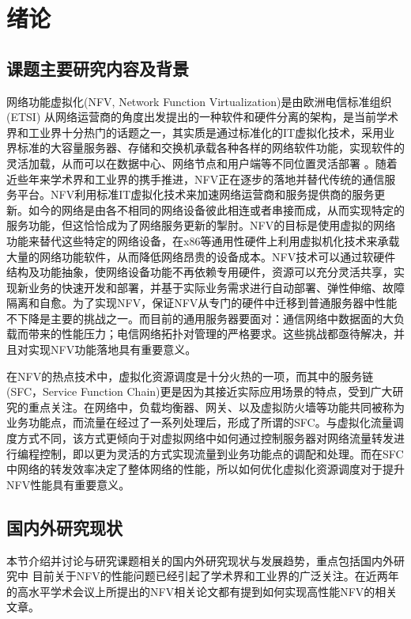 \chapter{绪论}
\label{chap: Introduction}


\section{课题主要研究内容及背景}
网络功能虚拟化(NFV, Network Function Virtualization)是由欧洲电信标准组织 (ETSI) 从网络运营商的角度出发提出的一种软件和硬件分离的架构，是当前学术界和工业界十分热门的话题之一，其实质是通过标准化的IT虚拟化技术，采用业界标准的大容量服务器、存储和交换机承载各种各样的网络软件功能，实现软件的灵活加载，从而可以在数据中心、网络节点和用户端等不同位置灵活部署 。随着近些年来学术界和工业界的携手推进，NFV正在逐步的落地并替代传统的通信服务平台。NFV利用标准IT虚拟化技术来加速网络运营商和服务提供商的服务更新。如今的网络是由各不相同的网络设备彼此相连或者串接而成，从而实现特定的服务功能，但这恰恰成为了网络服务更新的掣肘。NFV的目标是使用虚拟的网络功能来替代这些特定的网络设备，在x86等通用性硬件上利用虚拟机化技术来承载大量的网络功能软件，从而降低网络昂贵的设备成本。NFV技术可以通过软硬件结构及功能抽象，使网络设备功能不再依赖专用硬件，资源可以充分灵活共享，实现新业务的快速开发和部署，并基于实际业务需求进行自动部署、弹性伸缩、故障隔离和自愈。为了实现NFV，保证NFV从专门的硬件中迁移到普通服务器中性能不下降是主要的挑战之一。而目前的通用服务器要面对：通信网络中数据面的大负载而带来的性能压力；电信网络拓扑对管理的严格要求。这些挑战都亟待解决，并且对实现NFV功能落地具有重要意义。

在NFV的热点技术中，虚拟化资源调度是十分火热的一项，而其中的服务链(SFC，Service Function Chain)更是因为其接近实际应用场景的特点，受到广大研究的重点关注。在网络中，负载均衡器、网关、以及虚拟防火墙等功能共同被称为业务功能点，而流量在经过了一系列处理后，形成了所谓的SFC。与虚拟化流量调度方式不同，该方式更倾向于对虚拟网络中如何通过控制服务器对网络流量转发进行编程控制，即以更为灵活的方式实现流量到业务功能点的调配和处理。而在SFC中网络的转发效率决定了整体网络的性能，所以如何优化虚拟化资源调度对于提升NFV性能具有重要意义。

\section{国内外研究现状}
本节介绍并讨论与研究课题相关的国内外研究现状与发展趋势，重点包括国内外研究中
目前关于NFV的性能问题已经引起了学术界和工业界的广泛关注。在近两年的高水平学术会议上所提出的NFV相关论文都有提到如何实现高性能NFV的相关文章。

